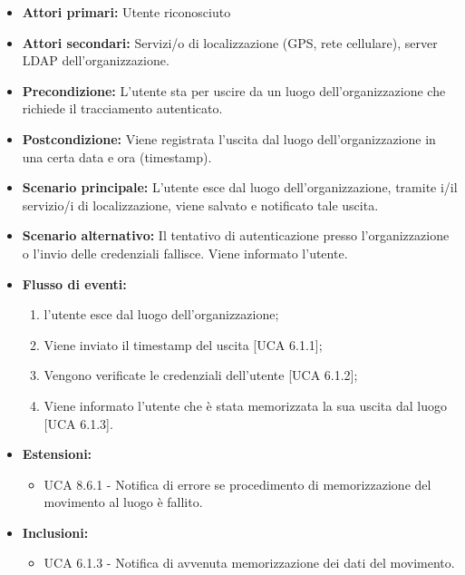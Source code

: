 \begin{itemize}
	\item \textbf{Attori primari:} Utente riconosciuto
	\item \textbf{Attori secondari:} Servizi/o di localizzazione (GPS, rete cellulare), server LDAP dell'organizzazione.
	\item \textbf{Precondizione:} L'utente sta per uscire da un luogo dell'organizzazione che richiede il tracciamento autenticato.
	\item \textbf{Postcondizione:} Viene registrata l'uscita dal luogo dell'organizzazione in una certa data e ora (timestamp).
	\item \textbf{Scenario principale:} L'utente esce dal luogo dell'organizzazione, tramite i/il servizio/i di localizzazione, viene salvato e notificato tale uscita. 
	\item \textbf{Scenario alternativo:} Il tentativo di autenticazione presso l'organizzazione o l'invio delle credenziali fallisce. Viene informato l'utente.
		\item \textbf{Flusso di eventi:}
	\begin{enumerate}
		\item l'utente esce dal luogo dell'organizzazione;
		\item Viene inviato il timestamp  del uscita [UCA 6.1.1];
		\item Vengono verificate le credenziali dell'utente [UCA 6.1.2];
		\item Viene informato l'utente che è stata memorizzata la sua uscita dal luogo [UCA 6.1.3].
	\end{enumerate}
	\item \textbf{Estensioni:}
		\begin{itemize}
		\item UCA 8.6.1 - Notifica di errore se procedimento di memorizzazione del movimento al luogo è fallito.
	\end{itemize}
	\item \textbf{Inclusioni:}
	\begin{itemize}
		\item UCA 6.1.3 - Notifica di avvenuta memorizzazione dei dati del movimento.
	\end{itemize}
\end{itemize}

